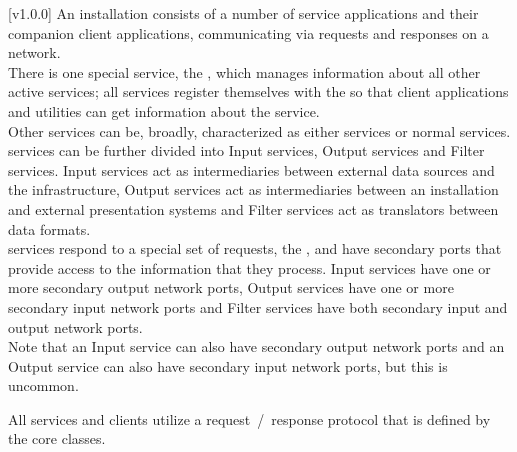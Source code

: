 [v1.0.0]
An \mplusm{} installation consists of a number of service applications and their companion
client applications, communicating via \mplusm{} requests and responses on a \yarp{}
network.\\

There is one special service, the , which
manages information about all other active services; all services register themselves
with the  so that client applications and
utilities can get information about the service.\\

Other services can be, broadly, characterized as either  services or normal
services.
 services can be further divided into Input services, Output services and
Filter services.
Input services act as intermediaries between external data sources and the \mplusm{}
infrastructure, Output services act as intermediaries between an \mplusm{}
installation and external presentation systems and Filter services act as translators
between data formats.\\

 services respond to a special set of requests, the
, and have secondary \yarp{}
ports that provide access to the information that they process.
Input services have one or more secondary output \yarp{} network ports, Output services
have one or more secondary input \yarp{} network ports and Filter services have both
secondary input and output \yarp{} network ports.\\

Note that an Input service can also have secondary output \yarp{} network ports and an
Output service can also have secondary input \yarp{} network ports, but this is uncommon.

All services and clients utilize a request~/~response protocol that is defined by the
\mplusm{}  core classes.\\

